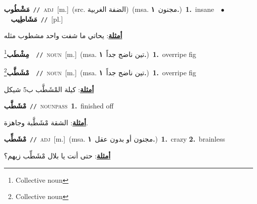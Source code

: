 \documentclass[10pt,a4paper,twoside]{article} %
\begin{document}
\begin{multicols}{2}
{\setlength\topsep{0pt}\textbf{\foreignlanguage{arabic}{مَشْطُوب}}\ {\color{gray}\texttt{//}\color{black}}\ \textsc{adj}\ [m.]\ (src. \color{gray}\foreignlanguage{arabic}{الضفة الغربية}\color{black})\ \color{gray}(msa. \foreignlanguage{arabic}{مجنون}~\foreignlanguage{arabic}{\textbf{١.}})\color{black}\ \textbf{1.}~insane\ \ $\bullet$\ \ \setlength\topsep{0pt}\textbf{\foreignlanguage{arabic}{مَشَاطِيب}}\ {\color{gray}\texttt{//}\color{black}}\ [pl.]\  \begin{flushright}\color{gray}\foreignlanguage{arabic}{\textbf{\underline{\foreignlanguage{arabic}{أمثلة}}}: يحاتي ما شفت واحد مشطوب مثله}\end{flushright}\color{black}} \vspace{2mm}

{\setlength\topsep{0pt}\textbf{\foreignlanguage{arabic}{مِشْطَب}}\footnote{Collective noun}\ \ {\color{gray}\texttt{//}\color{black}}\ \textsc{noun}\ [m.]\ \color{gray}(msa. \foreignlanguage{arabic}{تين ناضج جداً}~\foreignlanguage{arabic}{\textbf{١.}})\color{black}\ \textbf{1.}~overripe fig\ } \vspace{2mm}

{\setlength\topsep{0pt}\textbf{\foreignlanguage{arabic}{مْشَطَّب}}\footnote{Collective noun}\ \ {\color{gray}\texttt{//}\color{black}}\ \textsc{noun}\ [m.]\ \color{gray}(msa. \foreignlanguage{arabic}{تين ناضج جداً}~\foreignlanguage{arabic}{\textbf{١.}})\color{black}\ \textbf{1.}~overripe fig\  \begin{flushright}\color{gray}\foreignlanguage{arabic}{\textbf{\underline{\foreignlanguage{arabic}{أمثلة}}}: كيلة المْشَطَّب ب5 شيكل}\end{flushright}\color{black}} \vspace{2mm}

{\setlength\topsep{0pt}\textbf{\foreignlanguage{arabic}{مْشَطَّب}}\ {\color{gray}\texttt{//}\color{black}}\ \textsc{noun\textunderscore pass}\ \textbf{1.}~finished off\  \begin{flushright}\color{gray}\foreignlanguage{arabic}{\textbf{\underline{\foreignlanguage{arabic}{أمثلة}}}: الشقة مْشَطَّبة وجاهزة.}\end{flushright}\color{black}} \vspace{2mm}

{\setlength\topsep{0pt}\textbf{\foreignlanguage{arabic}{مْشَطِّب}}\ {\color{gray}\texttt{//}\color{black}}\ \textsc{adj}\ [m.]\ \color{gray}(msa. \foreignlanguage{arabic}{مجنون أو بدون عقل}~\foreignlanguage{arabic}{\textbf{١.}})\color{black}\ \textbf{1.}~crazy  \textbf{2.}~brainless\  \begin{flushright}\color{gray}\foreignlanguage{arabic}{\textbf{\underline{\foreignlanguage{arabic}{أمثلة}}}: حتى أنت يا بلال مْشَطِّب زيهم؟}\end{flushright}\color{black}} \vspace{2mm}


\end{multicols}
\end{document}
